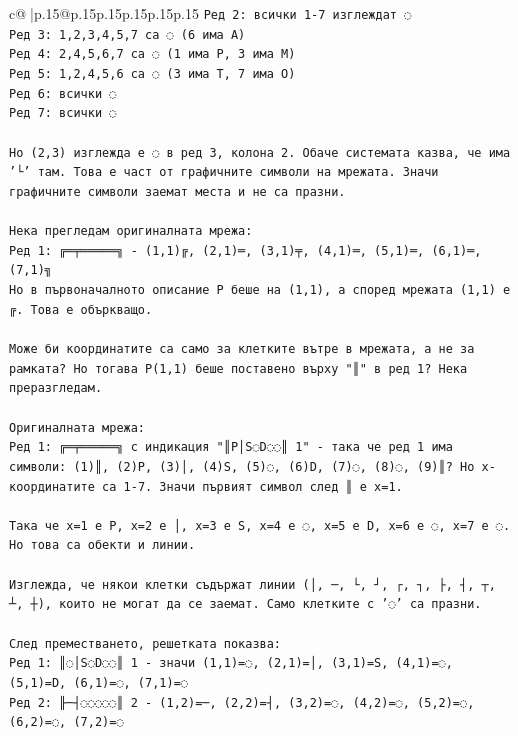 \documentclass{article}
\begin{document}
{\begin{supertabular}{c@{$\;$}|p{.15\linewidth}@{}p{.15\linewidth}p{.15\linewidth}p{.15\linewidth}p{.15\linewidth}p{.15\linewidth}}
{{{\texttt{Ред 2: всички 1{-}7 изглеждат ◌} \\
\texttt{Ред 3: 1,2,3,4,5,7 са ◌ (6 има A)} \\
\texttt{Ред 4: 2,4,5,6,7 са ◌ (1 има P, 3 има M)} \\
\texttt{Ред 5: 1,2,4,5,6 са ◌ (3 има T, 7 има O)} \\
\texttt{Ред 6: всички ◌} \\
\texttt{Ред 7: всички ◌} \\
\\ 
\texttt{Но (2,3) изглежда е ◌ в ред 3, колона 2. Обаче системата казва, че има '└' там. Това е част от графичните символи на мрежата. Значи графичните символи заемат места и не са празни.} \\
\\ 
\texttt{Нека прегледам оригиналната мрежа:} \\
\texttt{Ред 1: ╔═╤═════╗ {-} (1,1)╔, (2,1)═, (3,1)╤, (4,1)═, (5,1)═, (6,1)═, (7,1)╗} \\
\texttt{Но в първоначалното описание P беше на (1,1), а според мрежата (1,1) е ╔. Това е объркващо.} \\
\\ 
\texttt{Може би координатите са само за клетките вътре в мрежата, а не за рамката? Но тогава P(1,1) беше поставено върху "║" в ред 1? Нека преразгледам.} \\
\\ 
\texttt{Оригиналната мрежа:} \\
\texttt{Ред 1: ╔═╤═════╗ с индикация "║P│S◌D◌◌║ 1" {-} така че ред 1 има символи: (1)║, (2)P, (3)│, (4)S, (5)◌, (6)D, (7)◌, (8)◌, (9)║? Но x{-}координатите са 1{-}7. Значи първият символ след ║ е x=1.} \\
\\ 
\texttt{Така че x=1 е P, x=2 е │, x=3 е S, x=4 е ◌, x=5 е D, x=6 е ◌, x=7 е ◌. Но това са обекти и линии.} \\
\\ 
\texttt{Изглежда, че някои клетки съдържат линии (│, ─, └, ┘, ┌, ┐, ├, ┤, ┬, ┴, ┼), които не могат да се заемат. Само клетките с '◌' са празни.} \\
\\ 
\texttt{След преместването, решетката показва:} \\
\texttt{Ред 1: ║◌│S◌D◌◌║ 1 {-} значи (1,1)=◌, (2,1)=│, (3,1)=S, (4,1)=◌, (5,1)=D, (6,1)=◌, (7,1)=◌} \\
\texttt{Ред 2: ╟─┤◌◌◌◌◌║ 2 {-} (1,2)=─, (2,2)=┤, (3,2)=◌, (4,2)=◌, (5,2)=◌, (6,2)=◌, (7,2)=◌} \\
}}}
\end{supertabular}}
\end{document}
